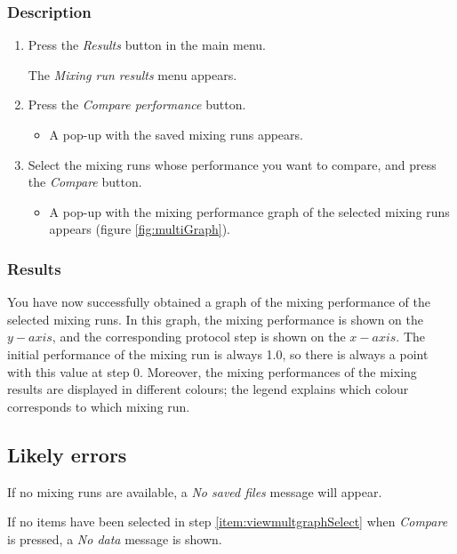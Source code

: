 \subsubsection{Description}\label{subsubsec:viewmultgraphDesc}
\begin{enumerate}
	\item Press the \emph{Results} button in the main menu.
		\begin{itemize}
            The \emph{Mixing run results} menu appears.
		\end{itemize}
	\item Press the \emph{Compare performance} button.
		\begin{itemize}
            \item A pop-up with the saved mixing runs appears.
		\end{itemize}
	\item Select the mixing runs whose performance you want to compare, and press the \emph{Compare} button. \label{item:viewmultgraphSelect}
		\begin{itemize}
            \item A pop-up with the mixing performance graph of the selected mixing runs appears (figure \ref{fig:multiGraph}).
		\end{itemize}
\end{enumerate}

\subsubsection{Results}
You have now successfully obtained a graph of the mixing performance of the selected mixing runs. In this graph, the mixing performance is shown on the $y-axis$, and the corresponding protocol step is shown on the $x-axis$. The initial performance of the mixing run is always 1.0, so there is always a point with this value at step 0. Moreover, the mixing performances of the mixing results are displayed in different colours; the legend explains which colour corresponds to which mixing run.

\subsection{Likely errors}
If no mixing runs are available, a \emph{No saved files} message will appear.

If no items have been selected in step \ref{item:viewmultgraphSelect} when \emph{Compare} is pressed, a \emph{No data} message is shown.


